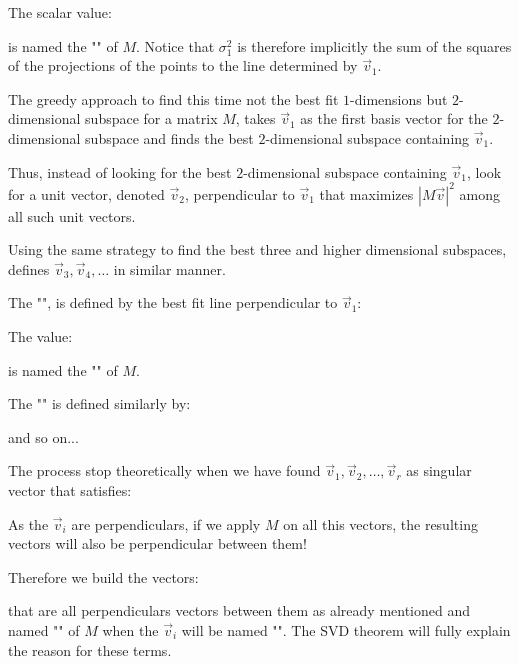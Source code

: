 	The scalar value:
	
	is named the "" of $M$. Notice that $\sigma_1^2$ is therefore implicitly the sum of the squares of the projections of the points to the line determined by $\vec{v}_1$.
	
	The greedy approach to find this time not the best fit $1$-dimensions but $2$-dimensional subspace for a matrix $M$, takes $\vec{v}_1$ as the first basis vector for the $2$-dimensional subspace and finds the best $2$-dimensional subspace containing $\vec{v}_1$.

	Thus, instead of looking for the best $2$-dimensional subspace containing $\vec{v}_1$, look for a unit vector, denoted $\vec{v}_2$, perpendicular to $\vec{v}_1$ that maximizes $|M\vec{v}|^2$ among all such unit vectors.

	Using the same strategy to find the best three and higher dimensional subspaces, defines $\vec{v}_3,\vec{v}_4,\ldots$ in similar manner.
	
	The "", is defined by the best fit line perpendicular to $\vec{v}_1$:
	
	The value:
	
	is named the "" of $M$. 

	The "" is defined similarly by:
	
	and so on...
	
	The process stop theoretically when we have found $\vec{v}_1,\vec{v}_2,\ldots,\vec{v}_r$ as singular vector that satisfies:
	
	
	As the $\vec{v}_i$ are perpendiculars, if we apply $M$ on all this vectors, the resulting vectors will also be perpendicular between them!

	Therefore we build the vectors:
	
	that are all perpendiculars vectors between them as already mentioned and named "" of $M$ when the $\vec{v}_i$ will be named "". The SVD theorem will fully explain the reason for these terms.
	
